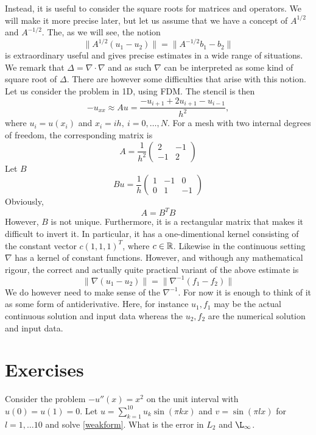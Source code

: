 Instead, it is useful to consider the square roots for matrices and operators. 
We will make it more precise later, but let us assume 
that we have a concept of 
$A^{1/2}$ and $A^{-1/2}$. The, as we will see,  the notion 
\[
\|A^{1/2}(u_1 - u_2) \| = \|A^{-1/2}b_1 - b_2\|     
\]
is extraordinary useful and gives precise estimates in a wide range of situations.  
We remark that $\Delta=\nabla\cdot\nabla$ and as such $\nabla$ can be interpreted
as some kind of square root of $\Delta$. There are however some difficulties that
arise with this notion. Let us consider the problem in 1D, using FDM. The stencil 
is then 
\[
- u_{xx} \approx A u =  \frac{-u_{i+1} + 2 u_{i+1}  -u_{i-1}}{h^2}, 
\]  
where $u_i= u(x_i)$ and $x_i = ih, \ i=0,\ldots, N$. 
For a mesh with two internal degrees of freedom, the corresponding matrix 
is 
\[
A = 
\frac{1}{h^2}\begin{pmatrix}
2 & -1 \\ -1 & 2 
\end{pmatrix}
\]
Let $B$ 
\[
B u = 
\frac{1}{h}\begin{pmatrix}
1 & -1 & 0  \\ 0 & 1 & -1  
\end{pmatrix}
\]
Obviously,  
\[
A = B^T B 
\]
However, $B$ is not unique. Furthermore, it is a rectangular matrix that makes
it difficult to invert it. In particular, it has a one-dimentional kernel
consisting of the constant vector $c (1,1,1)^T$, where $c\in \mathbb{R}$. Likewise
in the continuous setting $\nabla$ has a kernel of constant functions.  
However, and withough any mathematical rigour, 
the correct and actually quite practical 
variant of the above estimate is    
\[
\|\nabla (u_1 - u_2) \| = \|\nabla^{-1}(f_1 - f_2)\|     
\]
We do however need to make sense of the 
$\nabla^{-1}$. For now it is enough to think of it as some form of antiderivative. 
Here, for instance $u_1, f_1$ may be the actual continuous solution and input data whereas the 
$u_2, f_2$ are the numerical solution and input data. 


\section{Exercises}

\begin{exercise}
Consider the problem $-u''(x) = x^2$ on the unit interval with $u(0) = u(1) = 0$.  
Let $u=\sum_{k=1}^{10} u_k \sin(\pi k x )$ and $v=\sin(\pi l x)$ for $l=1, \ldots 10$
and solve \eqref{weakform}. What is the error in $L_2$ and $\L_\infty$.  
\end{exercise}

